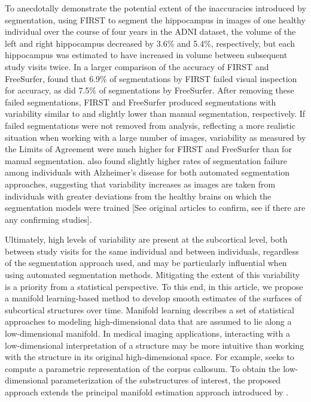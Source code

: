 \documentclass[11pt,reqno]{article}
\theoremstyle{definition}
\begin{document}
To anecdotally demonstrate the potential extent of the inaccuracies introduced by segmentation, using FIRST to segment the hippocampus in images of one healthy individual over the course of four years in the ADNI dataset, the volume of the left and right hippocampus decreased by 3.6\% and 5.4\%, respectively, but each hippocampus was estimated to have increased in volume between subsequent study visits twice. In a larger comparison of the accuracy of FIRST and FreeSurfer, \cite{mulderHippocampalVolumeChange2014} found that 6.9\% of segmentations by FIRST failed visual inspection for accuracy, as did 7.5\% of segmentations by FreeSurfer. After removing these failed segmentations, FIRST and FreeSurfer produced segmentations with variability similar to and slightly lower than manual segmentation, respectively. If failed segmentations were not removed from analysis, reflecting a more realistic situation when working with a large number of images, variability as measured by the Limits of Agreement were much higher for FIRST and FreeSurfer than for manual segmentation. \cite{mulderHippocampalVolumeChange2014} also found slightly higher rates of segmentation failure among individuals with Alzheimer's disease for both automated segmentation approaches, suggesting that variability increases as images are taken from individuals with greater deviations from the healthy brains on which the segmentation models were trained [See original articles to confirm, see if there are any confirming studies].

Ultimately, high levels of variability are present at the subcortical level, both between study visits for the same individual and between individuals, regardless of the segmentation approach used, and may be particularly influential when using automated segmentation methods. Mitigating the extent of this variability is a priority from a statistical perspective. To this end, in this article, we propose a manifold learning-based method to develop smooth estimates of the surfaces of subcortical structures over time. Manifold learning describes a set of statistical approaches to modeling high-dimensional data that are assumed to lie along a low-dimensional manifold. In medical imaging applications, interacting with a low-dimensional interpretation of a structure may be more intuitive than working with the structure in its original high-dimensional space. For example, \cite{yueParameterizationWhiteMatter2016} seeks to compute a parametric representation of the corpus callosum. To obtain the low-dimensional parameterization of the substructures of interest, the proposed approach extends the principal manifold estimation approach introduced by \cite{mengPrincipalManifoldEstimation2021}.
\end{document}
